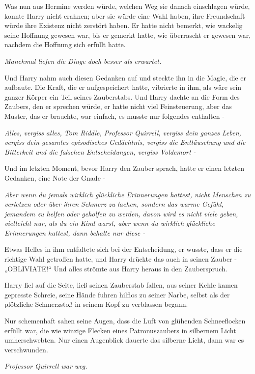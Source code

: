 {Was nun aus Hermine werden würde, welchen Weg sie danach einschlagen würde, konnte Harry nicht erahnen; aber sie würde eine Wahl haben, ihre Freundschaft würde ihre Existenz nicht zerstört haben. Er hatte nicht bemerkt, wie wackelig seine Hoffnung gewesen war, bis er gemerkt hatte, wie überrascht er gewesen war, nachdem die Hoffnung sich erfüllt hatte.

\emph{Manchmal liefen die Dinge doch besser als erwartet.}

Und Harry nahm auch diesen Gedanken auf und steckte ihn in die Magie, die er aufbaute. Die Kraft, die er aufgespeichert hatte, vibrierte in ihm, als wäre sein ganzer Körper ein Teil seines Zauberstabs. Und Harry dachte an die Form des Zaubers, den er sprechen würde, er hatte nicht viel Feinsteuerung, aber das Muster, das er brauchte, war einfach, es musste nur folgendes enthalten -

\emph{Alles, vergiss alles, Tom Riddle, Professor Quirrell, vergiss dein ganzes Leben, vergiss dein gesamtes episodisches Gedächtnis, vergiss die Enttäuschung und die Bitterkeit und die falschen Entscheidungen, vergiss Voldemort -}

Und im letzten Moment, bevor Harry den Zauber sprach, hatte er einen letzten Gedanken, eine Note der Gnade -

\emph{Aber wenn du jemals wirklich glückliche Erinnerungen hattest, nicht Menschen zu verletzen oder über ihren Schmerz zu lachen, sondern das warme Gefühl, jemandem zu helfen oder geholfen zu werden, davon wird es nicht viele geben, vielleicht nur, als du ein Kind warst, aber wenn du wirklich glückliche Erinnerungen hattest, dann behalte nur diese -}

Etwas Helles in ihm entfaltete sich bei der Entscheidung, er wusste, dass er die richtige Wahl getroffen hatte, und Harry drückte das auch in seinen Zauber -\\ „OBLIVIATE!“ Und alles strömte aus Harry heraus in den Zauberspruch.

Harry fiel auf die Seite, ließ seinen Zauberstab fallen, aus seiner Kehle kamen gepresste Schreie, seine Hände fuhren hilflos zu seiner Narbe, selbst als der plötzliche Schmerzstoß in seinem Kopf zu verblassen begann.

Nur schemenhaft sahen seine Augen, dass die Luft von glühenden Schneeflocken erfüllt war, die wie winzige Flecken eines Patronuszaubers in silbernem Licht umherschwebten. Nur einen Augenblick dauerte das silberne Licht, dann war es verschwunden.

\emph{Professor Quirrell war weg.}

}
